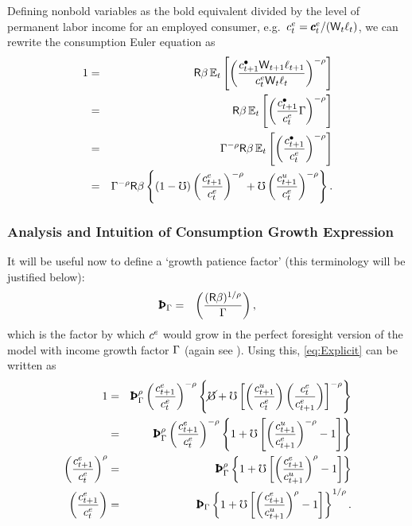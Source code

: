 \documentclass{handout}
\begin{document}
Defining nonbold variables as the bold equivalent divided
by the level of permanent labor income for an employed consumer, e.g.\ $c^{e}_{t}=\pmb{c}^{e}_{t}/(\mathsf{W}_{t}\ell_{t})$, we can rewrite the
consumption Euler equation as
\begin{eqnarray}
  1         & = & \mathsf{R}\beta \operatorname{\mathbb{E}}_{t}\left[\left(\frac{{c}^{\bullet}_{t+1}\mathsf{W}_{t+1}\ell_{t+1}}{c^{e}_{t}\mathsf{W}_{t}\ell_{t}}\right)^{-\rho} \right]  \label{eq:ceuler}
\\          & = & \mathsf{R}\beta \operatorname{\mathbb{E}}_{t}\left[\left(\frac{{c}^{\bullet}_{t+1}}{c^{e}_{t}}\Gamma\right)^{-\rho} \right]
\\          & = & \Gamma^{-\rho}\mathsf{R}\beta \operatorname{\mathbb{E}}_{t}\left[\left(\frac{{c}^{\bullet}_{t+1}}{c^{e}_{t}}\right)^{-\rho} \right] \label{eq:cEulerRaw}
\\          & = & \Gamma^{-\rho}\mathsf{R}\beta \left\{(1-\mho)\left(\frac{c^{e}_{t+1}}{c^{e}_{t}}\right)^{-\rho}+\mho \left(\frac{c^{u}_{t+1}}{c^{e}_{t}}\right)^{-\rho}\right\} \label{eq:Explicit}.
\end{eqnarray}

\subsubsection{Analysis and Intuition of Consumption Growth Expression}
It will be useful now to define a `growth patience factor' (this terminology will be justified below):
\begin{eqnarray}
  \PatPGro & = & \left(\frac{(\Rfree\Discount)^{1/\CRRA}}{\PGro}\right), \label{eq:PatPGro}
\end{eqnarray}
which is the factor by which $c^{e}$ would grow in the
perfect foresight version of the model with income growth factor
$\Gamma$ (again see ).  Using this,
\eqref{eq:Explicit} can be written as
\begin{eqnarray}
        1  & = & \PatPGro^{\CRRA} \left(\frac{\cRatE_{t+1}}{\cRatE_{t}}\right)^{-\CRRA} \left\{\erate+\urate\left[\left(\frac{\cU_{t+1}}{\cRatE_{t}}\right)\left(\frac{\cRatE_{t}}{\cRatE_{t+1}}\right)\right]^{-\CRRA}\right\}
\\       & = & \PatPGro^{\CRRA} \left(\frac{\cRatE_{t+1}}{\cRatE_{t}}\right)^{-\CRRA} \left\{1+\urate\left[\left(\frac{\cU_{t+1}}{\cRatE_{t+1}}\right)^{-\CRRA}-1\right]\right\}
\\       \left(\frac{\cRatE_{t+1}}{\cRatE_{t}}\right)^{\CRRA} & = & \PatPGro^{\CRRA} \left\{1+\urate\left[\left(\frac{\cRatE_{t+1}}{\cU_{t+1}}\right)^{\CRRA}-1\right]\right\} \label{eq:ctp1Oct}
\\       \left(\frac{\cRatE_{t+1}}{\cRatE_{t}}\right) & = & {\PatPGro} \left\{1+\urate\left[\left(\frac{\cRatE_{t+1}}{\cU_{t+1}}\right)^{\CRRA}-1\right]\right\}^{1/\CRRA}. \label{eq:cedel}
\end{eqnarray}
\end{document}
